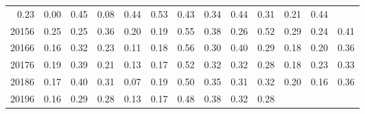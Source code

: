 \begin{table}[!h]
\begin{tabular}{lllllllllllll}
  \multicolumn{1}{|r}{0.23} &
  \multicolumn{1}{r}{0.00} &
  \multicolumn{1}{r}{0.45} &
  \multicolumn{1}{r}{0.08} &
  \multicolumn{1}{r}{0.44} &
  \multicolumn{1}{r}{0.53} &
  \multicolumn{1}{r}{0.43} &
  \multicolumn{1}{r}{0.34} &
  \multicolumn{1}{r}{0.44} &
  \multicolumn{1}{r}{0.31} &
  \multicolumn{1}{r}{0.21} &
  \multicolumn{1}{r}{0.44} \\
\multicolumn{1}{l}{\hspace{1em}20156} &
  \multicolumn{1}{|r}{0.25} &
  \multicolumn{1}{r}{0.25} &
  \multicolumn{1}{r}{0.36} &
  \multicolumn{1}{r}{0.20} &
  \multicolumn{1}{r}{0.19} &
  \multicolumn{1}{r}{0.55} &
  \multicolumn{1}{r}{0.38} &
  \multicolumn{1}{r}{0.26} &
  \multicolumn{1}{r}{0.52} &
  \multicolumn{1}{r}{0.29} &
  \multicolumn{1}{r}{0.24} &
  \multicolumn{1}{r}{0.41} \\
\multicolumn{1}{l}{\hspace{1em}20166} &
  \multicolumn{1}{|r}{0.16} &
  \multicolumn{1}{r}{0.32} &
  \multicolumn{1}{r}{0.23} &
  \multicolumn{1}{r}{0.11} &
  \multicolumn{1}{r}{0.18} &
  \multicolumn{1}{r}{0.56} &
  \multicolumn{1}{r}{0.30} &
  \multicolumn{1}{r}{0.40} &
  \multicolumn{1}{r}{0.29} &
  \multicolumn{1}{r}{0.18} &
  \multicolumn{1}{r}{0.20} &
  \multicolumn{1}{r}{0.36} \\
\multicolumn{1}{l}{\hspace{1em}20176} &
  \multicolumn{1}{|r}{0.19} &
  \multicolumn{1}{r}{0.39} &
  \multicolumn{1}{r}{0.21} &
  \multicolumn{1}{r}{0.13} &
  \multicolumn{1}{r}{0.17} &
  \multicolumn{1}{r}{0.52} &
  \multicolumn{1}{r}{0.32} &
  \multicolumn{1}{r}{0.32} &
  \multicolumn{1}{r}{0.28} &
  \multicolumn{1}{r}{0.18} &
  \multicolumn{1}{r}{0.23} &
  \multicolumn{1}{r}{0.33} \\
\multicolumn{1}{l}{\hspace{1em}20186} &
  \multicolumn{1}{|r}{0.17} &
  \multicolumn{1}{r}{0.40} &
  \multicolumn{1}{r}{0.31} &
  \multicolumn{1}{r}{0.07} &
  \multicolumn{1}{r}{0.19} &
  \multicolumn{1}{r}{0.50} &
  \multicolumn{1}{r}{0.35} &
  \multicolumn{1}{r}{0.31} &
  \multicolumn{1}{r}{0.32} &
  \multicolumn{1}{r}{0.20} &
  \multicolumn{1}{r}{0.16} &
  \multicolumn{1}{r}{0.36} \\
\multicolumn{1}{l}{\hspace{1em}20196} &
  \multicolumn{1}{|r}{0.16} &
  \multicolumn{1}{r}{0.29} &
  \multicolumn{1}{r}{0.28} &
  \multicolumn{1}{r}{0.13} &
  \multicolumn{1}{r}{0.17} &
  \multicolumn{1}{r}{0.48} &
  \multicolumn{1}{r}{0.38} &
  \multicolumn{1}{r}{0.32} &
  \multicolumn{1}{r}{0.28} &

\end{tabular}
\end{table}
